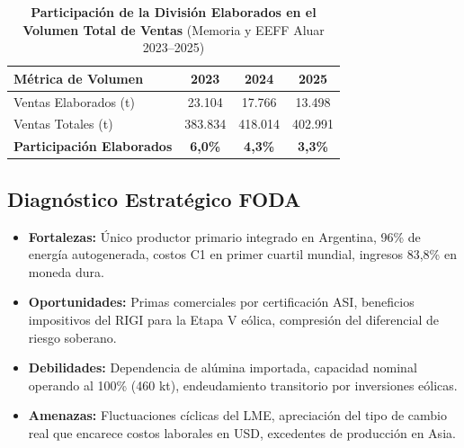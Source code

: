 \documentclass[11pt,a4paper]{article}
\begin{document}
\begin{table}[H]
\centering
\caption{\textbf{Participación de la División Elaborados en el Volumen Total de Ventas} {\small\color{gsgray} (Memoria y EEFF Aluar 2023–2025)}}
\small
\begin{tabular}{lccc}
\toprule
\textbf{Métrica de Volumen} & \textbf{2023} & \textbf{2024} & \textbf{2025} \\
\midrule
Ventas Elaborados (t) & 23.104 & 17.766 & 13.498 \\
Ventas Totales (t) & 383.834 & 418.014 & 402.991 \\
\textbf{Participación Elaborados} & \textbf{6,0\%} & \textbf{4,3\%} & \textbf{3,3\%} \\
\bottomrule
\end{tabular}
\end{table}

\subsection{Diagnóstico Estratégico FODA}
\begin{itemize}
    \item \textbf{Fortalezas:} Único productor primario integrado en Argentina, 96\% de energía autogenerada, costos C1 en primer cuartil mundial, ingresos 83,8\% en moneda dura.
    \item \textbf{Oportunidades:} Primas comerciales por certificación ASI, beneficios impositivos del RIGI para la Etapa V eólica, compresión del diferencial de riesgo soberano.
    \item \textbf{Debilidades:} Dependencia de alúmina importada, capacidad nominal operando al 100\% (460 kt), endeudamiento transitorio por inversiones eólicas.
    \item \textbf{Amenazas:} Fluctuaciones cíclicas del LME, apreciación del tipo de cambio real que encarece costos laborales en USD, excedentes de producción en Asia.
\end{itemize}
\end{document}
